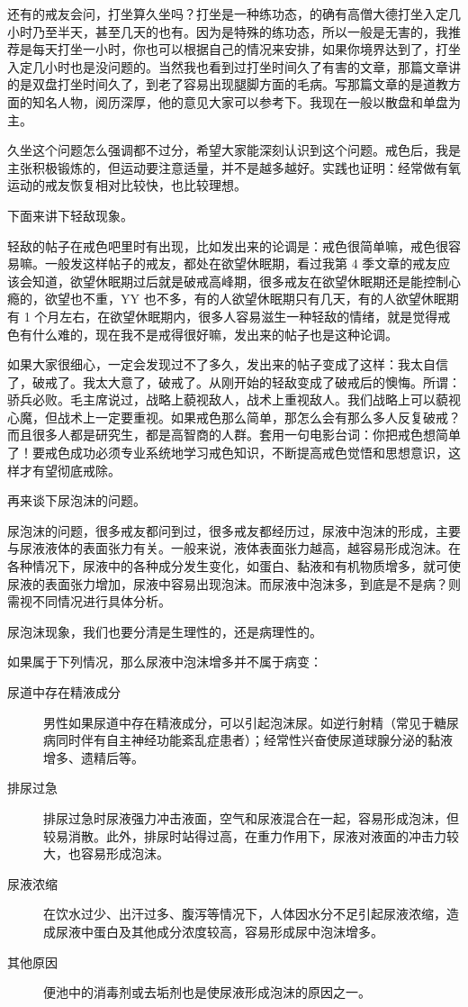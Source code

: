 \documentclass{ctexart}
\begin{document}
还有的戒友会问，打坐算久坐吗？打坐是一种练功态，的确有高僧大德打坐入定几小时乃至半天，甚至几天的也有。因为是特殊的练功态，所以一般是无害的，我推荐是每天打坐一小时，你也可以根据自己的情况来安排，如果你境界达到了，打坐入定几小时也是没问题的。当然我也看到过打坐时间久了有害的文章，那篇文章讲的是双盘打坐时间久了，到老了容易出现腿脚方面的毛病。写那篇文章的是道教方面的知名人物，阅历深厚，他的意见大家可以参考下。我现在一般以散盘和单盘为主。

久坐这个问题怎么强调都不过分，希望大家能深刻认识到这个问题。戒色后，我是主张积极锻炼的，但运动要注意适量，并不是越多越好。实践也证明：经常做有氧运动的戒友恢复相对比较快，也比较理想。

下面来讲下轻敌现象。

轻敌的帖子在戒色吧里时有出现，比如发出来的论调是：戒色很简单嘛，戒色很容易嘛。一般发这样帖子的戒友，都处在欲望休眠期，看过我第 4 季文章的戒友应该会知道，欲望休眠期过后就是破戒高峰期，很多戒友在欲望休眠期还是能控制心瘾的，欲望也不重，YY 也不多，有的人欲望休眠期只有几天，有的人欲望休眠期有 1 个月左右，在欲望休眠期内，很多人容易滋生一种轻敌的情绪，就是觉得戒色有什么难的，现在我不是戒得很好嘛，发出来的帖子也是这种论调。

如果大家很细心，一定会发现过不了多久，发出来的帖子变成了这样：我太自信了，破戒了。我太大意了，破戒了。从刚开始的轻敌变成了破戒后的懊悔。所谓：骄兵必败。毛主席说过，战略上藐视敌人，战术上重视敌人。我们战略上可以藐视心魔，但战术上一定要重视。如果戒色那么简单，那怎么会有那么多人反复破戒？而且很多人都是研究生，都是高智商的人群。套用一句电影台词：你把戒色想简单了！要戒色成功必须专业系统地学习戒色知识，不断提高戒色觉悟和思想意识，这样才有望彻底戒除。

再来谈下尿泡沫的问题。

尿泡沫的问题，很多戒友都问到过，很多戒友都经历过，尿液中泡沫的形成，主要与尿液液体的表面张力有关。一般来说，液体表面张力越高，越容易形成泡沫。在各种情况下，尿液中的各种成分发生变化，如蛋白、黏液和有机物质增多，就可使尿液的表面张力增加，尿液中容易出现泡沫。而尿液中泡沫多，到底是不是病？则需视不同情况进行具体分析。

尿泡沫现象，我们也要分清是生理性的，还是病理性的。

如果属于下列情况，那么尿液中泡沫增多并不属于病变：

\begin{description}
    \item [尿道中存在精液成分] 男性如果尿道中存在精液成分，可以引起泡沫尿。如逆行射精（常见于糖尿病同时伴有自主神经功能紊乱症患者）；经常性兴奋使尿道球腺分泌的黏液增多、遗精后等。
    \item [排尿过急] 排尿过急时尿液强力冲击液面，空气和尿液混合在一起，容易形成泡沫，但较易消散。此外，排尿时站得过高，在重力作用下，尿液对液面的冲击力较大，也容易形成泡沫。
    \item [尿液浓缩] 在饮水过少、出汗过多、腹泻等情况下，人体因水分不足引起尿液浓缩，造成尿液中蛋白及其他成分浓度较高，容易形成尿中泡沫增多。
    \item [其他原因] 便池中的消毒剂或去垢剂也是使尿液形成泡沫的原因之一。
\end{description}
\end{document}
